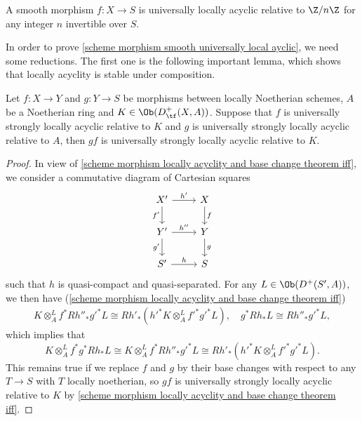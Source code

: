 \begin{theorem}\label{scheme morphism smooth universally local ayclic}
A smooth morphism $f:X\to S$ is universally locally acyclic relative to $\Z/n\Z$ for any integer $n$ invertible over $S$.
\end{theorem}

In order to prove \cref{scheme morphism smooth universally local ayclic}, we need some reductions. The first one is the following important lemma, which shows that locally acyclity is stable under composition.

\begin{lemma}\label{scheme morphism smooth universally local ayclic composition prop}
Let $f:X\to Y$ and $g:Y\to S$ be morphisms between locally Noetherian schemes, $A$ be a Noetherian ring and $K\in\Ob(D^+_{\tf}(X,A))$. Suppose that $f$ is universally strongly locally acyclic relative to $K$ and $g$ is universally strongly locally acyclic relative to $A$, then $gf$ is universally strongly locally acyclic relative to $K$.
\end{lemma}
\begin{proof}
In view of \cref{scheme morphism locally acyclity and base change theorem iff}, we consider a commutative diagram of Cartesian squares
\[\begin{tikzcd}
X'\ar[r,"h'"]\ar[d,swap,"f'"]&X\ar[d,"f"]\\
Y'\ar[r,"h''"]\ar[d,swap,"g'"]&Y\ar[d,"g"]\\
S'\ar[r,"h"]&S
\end{tikzcd}\]
such that $h$ is quasi-compact and quasi-separated. For any $L\in\Ob(D^+(S',A))$, we then have (\cref{scheme morphism locally acyclity and base change theorem iff})
\begin{align*}
K\otimes_A^Lf^*Rh''_*g'^*L\cong Rh'_*(h'^*K\otimes_A^Lf'^*g'^*L),\quad g^*Rh_*L\cong Rh''_*g'^*L,
\end{align*}
which implies that 
\[K\otimes_A^Lf^*g^*Rh_*L\cong K\otimes_A^Lf^*Rh''_*g'^*L\cong Rh'_*(h'^*K\otimes_A^Lf'^*g'^*L).\]
This remains true if we replace $f$ and $g$ by their base changes with respect to any $T\to S$ with $T$ locally noetherian, so $gf$ is universally strongly locally acyclic relative to $K$ by \cref{scheme morphism locally acyclity and base change theorem iff}.
\end{proof}

